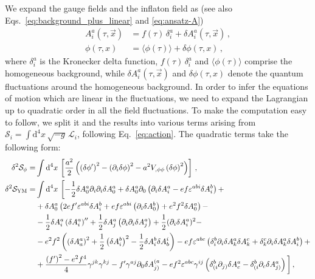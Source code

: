 We expand the gauge fields and the inflaton field as (see also Eqs.~\eqref{eq:background_plus_linear} and \eqref{eq:ansatz-A})
\begin{align}
 A^a_i(\tau, \vec x) & = f(\tau) \, \delta^a_i + \delta A^a_i(\tau, \vec x) \,, \\
 \phi(\tau,x) &  = \langle\phi(\tau)\rangle + \delta \phi (\tau,x) \,,
\end{align}
where $\delta^a_i$ is the Kronecker delta function, $f(\tau) \, \delta^a_i$ and $\langle\phi(\tau)\rangle$ comprise the homogeneous background, while $\delta A^a_i(\tau, \vec x)$ and $\delta \phi(\tau,x)$ denote the quantum fluctuations around the homogeneous background. In order to infer the equations of motion which are linear in the fluctuations, we need to expand the Lagrangian up to quadratic order in all the field fluctuations. To make the computation easy to follow, we split it and the results into various terms arising from $\mathcal{S}_i = \int \textrm{d}^4 x \, \sqrt{-g} \, \mathcal{L}_i$, following Eq.~\eqref{eq:action}. The quadratic terms take the following form:
\begin{align}
 \delta^2 \mathcal{S}_\phi  = & \int \textrm{d}^4 x\, \left[\frac{a^2}{2} \left(\left(\delta \phi'\right)^2  - \left(\partial_i \delta \phi \right)^2 - a^2 V_{,\phi\phi} \left(\delta \phi\right)^2 \right)\right]\,, \\
\delta^2 \mathcal{S}_{\rm YM}  = & \int \textrm{d}^4x \, \left[- \frac{1}{2} \delta A^a_0 \partial_i \partial_i  \delta A^a_0 + \delta A^a_0 \partial_0 \left(\partial_i \delta A^a_i - e f \varepsilon^{abi} \delta A^b_i \right) + \right. \nonumber \\
& + \delta A^a_0 \left(2 e f' \varepsilon^{abi} \delta A^b_i + e f \varepsilon^{abi} \left(\partial_i\delta A^b_0\right) + e^2 f^2 \delta A^a_0\right) - \nonumber \\
& - \frac{1}{2}  \delta A^a_i  \left(\delta A^a_i\right)'' + \frac{1}{2} \delta A^a_j \left(\partial_i \partial_i \delta A^a_j\right) + \frac{1}{2} (\partial_i \delta A^a_i)^2 - \nonumber \\
& - e^2 f^2 \left(\left(\delta A^a_a\right)^2 + \frac{1}{2} \left(\delta A^b_i\right)^2 - \frac{1}{2} \delta A^b_i \delta A^i_b \right) - e f \varepsilon^{abc} \left( \delta^b_i \partial_i \delta A^a_k \delta A^c_k + \delta^c_k \partial_i \delta A^a_k \delta A^b_i \right) + \nonumber \\
& + \frac{\left(f'\right)^2 - e^2 f^4}{4} \gamma^{jk} \gamma^{kj} - f' \gamma^{aj} \partial_0 \delta A^{(a}_{j)} - e f^2 \varepsilon^{abc} \gamma^{ij} \left(\delta^b_{(i} \partial_{j)} \delta A^a_{c} - \delta^b_{(i} \partial_{c} \delta A^a_{j)} \right) \bigg] \,,
\label{eq:QuadraticLYMMainText}
\end{align}
